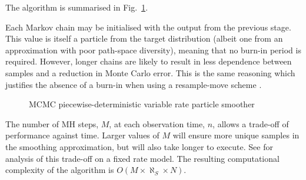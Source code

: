 \documentclass[10pt,twocolumn,twoside]{IEEEtran}
\begin{document}
The algorithm is summarised in Fig.~\ref{alg:VRPS}.

Each Markov chain may be initialised with the output from the previous stage. This value is itself a particle from the target distribution (albeit one from an approximation with poor path-space diversity), meaning that no burn-in period is required. However, longer chains are likely to result in less dependence between samples and a reduction in Monte Carlo error. This is the same reasoning which justifies the absence of a burn-in when using a resample-move scheme \cite{Gilks2001}.

\begin{figure}
\caption{MCMC piecewise-deterministic variable rate particle smoother}
\label{alg:VRPS}
\end{figure}

The number of MH steps, $M$, at each observation time, $n$, allows a trade-off of performance against time. Larger values of $M$ will ensure more unique samples in the smoothing approximation, but will also take longer to execute. See \cite{Bunch2012} for analysis of this trade-off on a fixed rate model. The resulting computational complexity of the algorithm is $O(M \times \aleph_S \times N)$.
\end{document}
